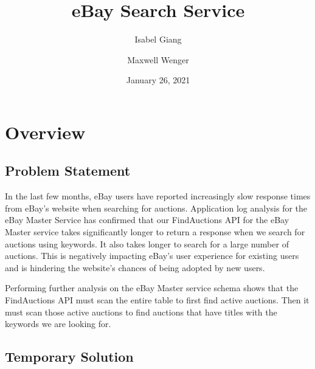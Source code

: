\documentclass[12pt,a4paper]{article}
\title{eBay Search Service}
\author{Isabel Giang}
\author{Maxwell Wenger}
\affil{CSS490 Group Y4}
\date{January 26, 2021}
\begin{document}
\maketitle
\setcounter{tocdepth}{2}
\tableofcontents



\pagebreak
\section{Overview}
\subsection{Problem Statement}
In the last few months, eBay users have reported increasingly slow response
times from eBay's website when searching for auctions. Application log analysis
for the eBay Master Service has confirmed that our FindAuctions API for the
eBay Master service takes significantly longer to return a response when we
search for auctions using keywords. It also takes longer to search for a large
number of auctions.
\vspace{\baselineskip}
This is negatively impacting eBay's user experience for existing users and is
hindering the website's chances of being adopted by new users.

\vspace{\baselineskip}

Performing further analysis on the eBay Master service schema shows that the
FindAuctions API must scan the entire table to first find active auctions. Then
it must scan those active auctions to find auctions that have titles with the
keywords we are looking for.

\subsection{Temporary Solution}
\end{document}
